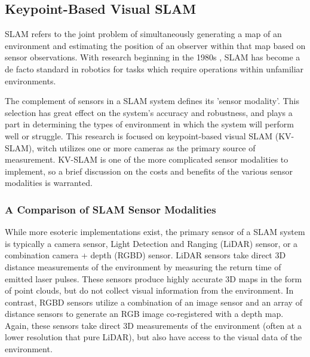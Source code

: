 \subsection{Keypoint-Based Visual SLAM}

SLAM refers to the joint problem of simultaneously generating a map of an environment and estimating the position of an observer within that map based on sensor observations. With research beginning in the 1980s \cite{smithEstimatingUncertainSpatial1988}, SLAM has become a de facto standard in robotics for tasks which require operations within unfamiliar environments. 

The complement of sensors in a SLAM system defines its 'sensor modality'. This selection has great effect on the system's accuracy and robustness, and plays a part in determining the types of environment in which the system will perform well or struggle. This research is focused on keypoint-based visual SLAM (KV-SLAM), witch utilizes one or more cameras as the primary source of measurement. KV-SLAM is one of the more complicated sensor modalities to implement, so a brief discussion on the costs and benefits of the various sensor modalities is warranted.

\subsubsection{A Comparison of SLAM Sensor Modalities}

While more esoteric implementations exist, the primary sensor of a SLAM system is typically a camera sensor, Light Detection and Ranging (LiDAR) sensor, or a combination camera + depth (RGBD) sensor. LiDAR sensors take direct 3D distance measurements of the environment by measuring the return time of emitted laser pulses. These sensors produce highly accurate 3D maps in the form of point clouds, but do not collect visual information from the environment. In contrast, RGBD sensors utilize a combination of an image sensor and an array of distance sensors to generate an RGB image co-registered with a depth map. Again, these sensors take direct 3D measurements of the environment (often at a lower resolution that pure LiDAR), but also have access to the visual data of the environment.


